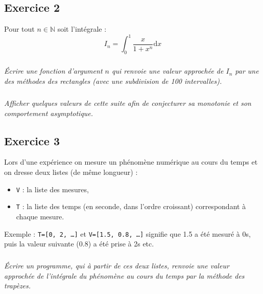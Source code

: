\documentclass[10pt,oneside]{article}
\begin{document}
% 
 
 
\newpage


\subsection*{Exercice 2}
\setcounter{subparagraph}{0} 
Pour tout $n\in\mathbb{N}$ soit l'intégrale : 
$$I_n=\int_0^1\frac{x}{1+x^n} \text{d}x$$

\subparagraph{}
\textit{Écrire une fonction d'argument $n$ qui renvoie une valeur approchée de $I_n$ par une des méthodes des rectangles (avec une subdivision de 100 intervalles).}

\subparagraph{}
\textit{Afficher quelques  valeurs de cette suite afin de conjecturer sa monotonie et son comportement asymptotique.}

\subsection*{Exercice 3}
\setcounter{subparagraph}{0}
Lors d'une expérience on mesure un phénomène numérique au cours du temps et on dresse deux listes (de même longueur) :
\begin{itemize}
\item \texttt{V} : la liste des mesures, 
\item \texttt{T} : la liste des temps (en seconde, dans l'ordre croissant) correspondant à chaque mesure.
\end{itemize}
Exemple : \texttt{T=[0, 2, \ldots]} et \texttt{V=[1.5, 0.8, \ldots]} signifie que 1.5 a été mesuré à 0s, puis la valeur suivante  (0.8) a été prise à 2s etc.

\subparagraph{}
\textit{Écrire un programme, qui à partir de ces deux listes, renvoie une valeur approchée de l'intégrale du phénomène au cours du temps par la méthode des trapèzes.}
\end{document}
